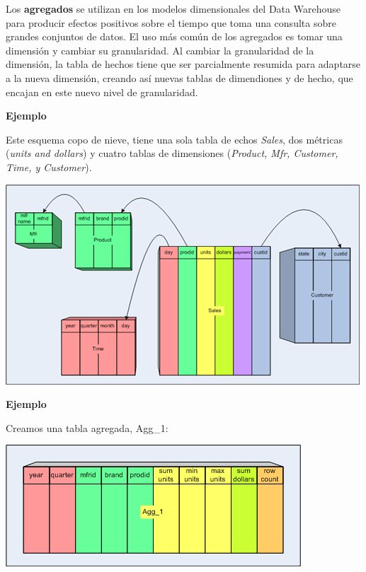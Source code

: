 \documentclass{fancyslides}
\begin{document}
\begin{frame}
\end{frame}

\begin{frame}
\misc
{
Los \textbf{agregados} se utilizan en los modelos dimensionales del Data Warehouse para producir efectos positivos sobre el tiempo que toma una consulta sobre grandes conjuntos de datos. El uso más común de los agregados es tomar una dimensión y cambiar su granularidad.
Al cambiar la granularidad de la dimensión, la tabla de hechos tiene que ser parcialmente resumida para adaptarse a la nueva dimensión, creando así nuevas tablas de dimendiones y de hecho, que encajan en este nuevo nivel de granularidad. 
}
\end{frame}

\begin{frame}
\misc
{
\textbf{Ejemplo}

Este esquema copo de nieve, tiene una sola tabla de echos \textit{Sales}, dos métricas (\textit{units and dollars}) y cuatro tablas de dimensiones (\textit{Product, Mfr, Customer, Time, y Customer}).

\begin{center}
\includegraphics[scale=0.5]{aggregate_tables_1}
\end{center}
}
\end{frame}

\begin{frame}
\misc
{
\textbf{Ejemplo}

Creamos una tabla agregada, Agg\_1:
 
\begin{center}
\includegraphics[scale=0.5]{aggregate_tables_2}
\end{center}
}
\end{frame}
\end{document}
